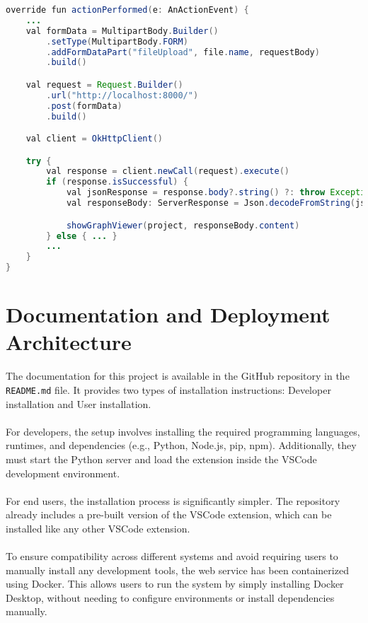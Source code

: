 \begin{lstlisting}[caption={Render graph in WebView in IntelliJ}, label={lst:open-web-view-intellij}, language=Java]
override fun actionPerformed(e: AnActionEvent) {
    ...
    val formData = MultipartBody.Builder()
        .setType(MultipartBody.FORM)
        .addFormDataPart("fileUpload", file.name, requestBody)
        .build()

    val request = Request.Builder()
        .url("http://localhost:8000/")
        .post(formData)
        .build()

    val client = OkHttpClient()

    try {
        val response = client.newCall(request).execute()
        if (response.isSuccessful) {
            val jsonResponse = response.body?.string() ?: throw Exception("Empty response body")
            val responseBody: ServerResponse = Json.decodeFromString(jsonResponse)

            showGraphViewer(project, responseBody.content)
        } else { ... }
        ...
    }
}
\end{lstlisting}

\section{Documentation and Deployment Architecture\label{sec:docu}}

The documentation for this project is available in the GitHub repository in the \texttt{README.md} file.  
It provides two types of installation instructions: Developer installation and User installation.
\\
\\
For developers, the setup involves installing the required programming languages, runtimes, and dependencies (e.g., Python, Node.js, pip, npm).  
Additionally, they must start the Python server and load the extension inside the VSCode development environment.
\\
\\
For end users, the installation process is significantly simpler.  
The repository already includes a pre-built version of the VSCode extension, which can be installed like any other VSCode extension.
\\
\\
To ensure compatibility across different systems and avoid requiring users to manually install any development tools, the web service has been containerized using Docker.  
This allows users to run the system by simply installing Docker Desktop, without needing to configure environments or install dependencies manually.
